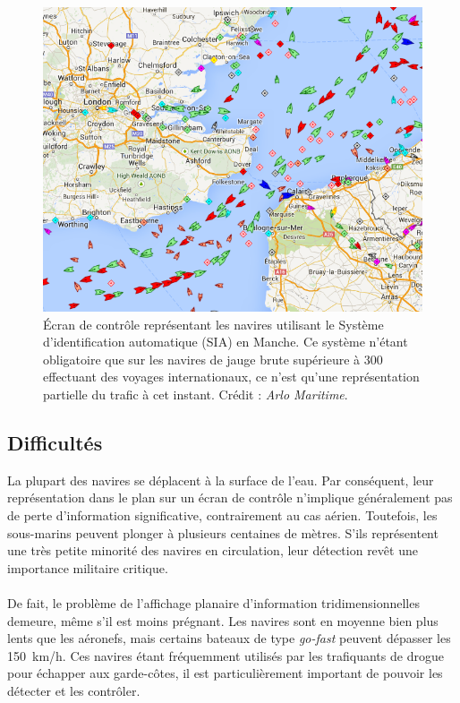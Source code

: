 	
	\begin{figure}[H]
		\centering
		\includegraphics[width=\textwidth]{figures/ch1/channel}
		\caption{Écran de contrôle représentant les navires utilisant le Système d'identification automatique (SIA) en Manche. Ce système n'étant obligatoire que sur les navires de jauge brute supérieure à 300 effectuant des voyages internationaux, ce n'est qu'une représentation partielle du trafic à cet instant. Crédit : \emph{Arlo Maritime}.}
		\label{fig:channel}
	\end{figure}
	
	\subsection{Difficultés}
	La plupart des navires se déplacent à la surface de l'eau. Par conséquent, leur représentation dans le plan sur un écran de contrôle n'implique généralement pas de perte d'information significative, contrairement au cas aérien. Toutefois, les sous-marins peuvent plonger à plusieurs centaines de mètres. S'ils représentent une très petite minorité des navires en circulation, leur détection revêt une importance militaire critique.
	
	\paragraph*{}
	De fait, le problème de l'affichage planaire d'information tridimensionnelles demeure, même s'il est moins prégnant. Les navires sont en moyenne bien plus lents que les aéronefs, mais certains bateaux de type \emph{go-fast} peuvent dépasser les 150~km/h. Ces navires étant fréquemment utilisés par les trafiquants de drogue pour échapper aux garde-côtes, il est particulièrement important de pouvoir les détecter et les contrôler.
	
